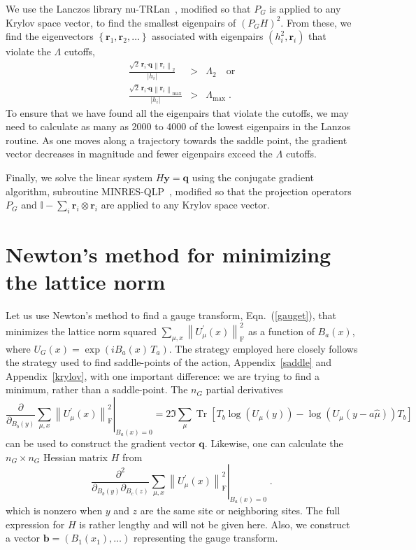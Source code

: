 \documentclass[preprint,aps,prd]{revtex4-2}
\newcommand{\be}{\begin{equation}}
\newcommand{\eq}{\end{equation}}
\newcommand{\heigen}{h}
\DeclareMathOperator{\Tr}{Tr}
\newcommand\fnorm[1]{\left\lVert #1 \right\rVert_\mathrm{F}}
\begin{document}
We use the Lanczos library nu-TRLan~\cite{yamazaki_adaptive_2010},
modified so that $P_G$ is applied to any Krylov space vector, to
find the smallest eigenpairs of $\left(P_G H\right)^2$.  From these, we find
the eigenvectors $\left\{\mathbf{r}_1, \mathbf{r}_2, \ldots\right\}$
associated with eigenpairs $\left(\heigen_i^2, \mathbf{r}_i\right)$
that violate the $\Lambda$ cutoffs,
%
\begin{eqnarray}
   \frac{\sqrt{2}\, \mathbf{r}_i \mathbf{\cdot} \mathbf{q}
   \left\lVert \mathbf{r}_i\right\rVert_2}{\left|\heigen_i\right| }
     &>& \Lambda_2  \quad\mbox{or} \\
   \frac{\sqrt{2}\, \mathbf{r}_i\mathbf{\cdot} \mathbf{q}
   \left\lVert \mathbf{r}_i\right\rVert_\mathrm{max}}{\left|\heigen_i\right| }
     &>& \Lambda_\mathrm{max} \; .
\end{eqnarray}
%
To ensure that we have found all the eigenpairs that violate the cutoffs,
we may need to calculate as many as 2000 to 4000 of the lowest eigenpairs
in the Lanzos routine.  As one moves along a trajectory towards the
saddle point, the gradient vector decreases in magnitude and fewer eigenpairs
exceed the $\Lambda$ cutoffs.

Finally, we solve the linear system $H \mathbf{y} = \mathbf{q}$
using the conjugate gradient algorithm,
subroutine MINRES-QLP~\cite{choi_algorithm_2014}, modified so that
the projection operators $P_G$ and 
$\mathbb{I}- \sum_{i} \mathbf{r}_i \otimes \mathbf{r}_i$
are applied to any Krylov space vector.


\section{Newton's method for minimizing the lattice norm}
\label{newtonNorm}

Let us use Newton's method to find a gauge transform, Eqn.~(\ref{gauget}),
that minimizes the lattice norm squared $\sum_{\mu,x}\fnorm{U_\mu^\prime(x)}^2$
as a function of $B_a(x)$,
where $U_G(x) = \exp\left(i B_a(x)\, T_a\right)$.
The strategy employed here closely follows the strategy used to find
saddle-points of the action, Appendix~\ref{saddle} and
Appendix~\ref{krylov}, with one important difference:  we are trying
to find a minimum, rather than a saddle-point.  The $n_G$ partial
derivatives
%
\be
   \left.\frac{\partial}{\partial_{B_b(y)}} \sum_{\mu,x}
   \fnorm{U_\mu^\prime(x)}^2\right|_{B_a(x)=0} =
   2 \Im \sum_\mu \Tr\left[T_b \log\left(U_\mu(y)\right)
             - \log\left(U_\mu(y-a\hat\mu)\right)T_b\right]
   \label{normGrad}
\eq
can be used to construct the gradient vector $\mathbf{q}$.
Likewise, one can calculate the $n_G\times n_G$ Hessian matrix
$H$ from
\be
   \left.\frac{\partial^2}{\partial_{B_b(y)}\partial_{B_c(z)}} \sum_{\mu,x}
         \fnorm{U_\mu^\prime(x)}^2\right|_{B_a(x)=0} \; .
\eq
which is nonzero when $y$ and $z$ are the same site or neighboring sites.
The full expression for $H$ is rather lengthy and
will not be given here.  Also, we construct a vector
$\mathbf{b} =  \left(B_1(x_1), \ldots \right)$ representing the
gauge transform.
\end{document}
